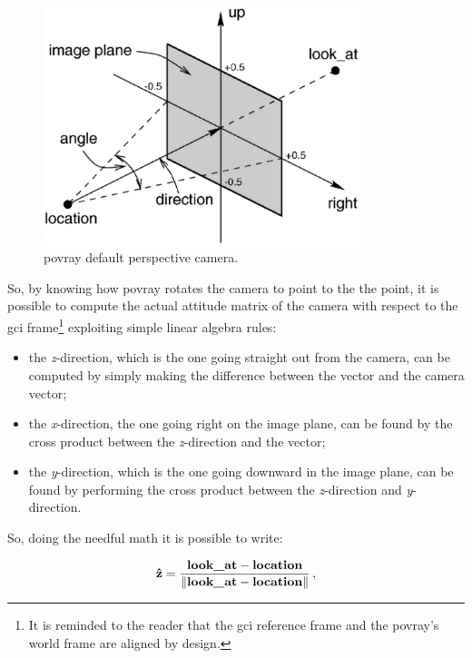 \begin{figure}[htbp]
  \centering
  \includegraphics[width=0.82\textwidth]{gfx/perspcam.eps}
  \caption{\acrshort{povray} default perspective camera.}
  \label{fig:perspcam}
\end{figure}

So, by knowing how \acrshort{povray} rotates the camera to point to the the  point, it is possible to compute the actual attitude matrix of the camera with respect to the \acrshort{gci} frame\footnote{It is reminded to the reader that the \acrshort{gci} reference frame and the \acrshort{povray}'s world frame are aligned by design.} exploiting simple linear algebra rules:

\begin{itemize}
  \item the \textit{z}-direction, which is the one going straight out from the camera, can be computed by simply making the difference between the  vector and the camera  vector;
  \item the \textit{x}-direction, the one going right on the image plane, can be found by the cross product between the \textit{z}-direction and the  vector;
  \item the \textit{y}-direction, which is the one going downward in the image plane, can be found by performing the cross product between the \textit{z}-direction and \textit{y}-direction.
\end{itemize}

So, doing the needful math it is possible to write:

\begin{equation}
  \mathbf{\hat{z}} = \frac{\text{\inlinecode{POV}{look_at}} - \text{\inlinecode{POV}{location}}}{\norm{\text{\inlinecode{POV}{look_at}} - \text{\inlinecode{POV}{location}}}} \,,
\end{equation}

